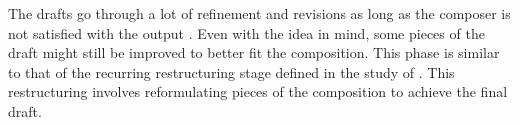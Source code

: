         The drafts go through a lot of refinement and revisions as long as the composer is not satisfied with the output \citep{bennett1976process}. Even with the idea in mind, some pieces of the draft might still be improved to better fit the composition. This phase is similar to that of the recurring restructuring stage defined in the study of \citet{collins2005synthesis}. This restructuring involves reformulating pieces of the composition to achieve the final draft. 
        
        


